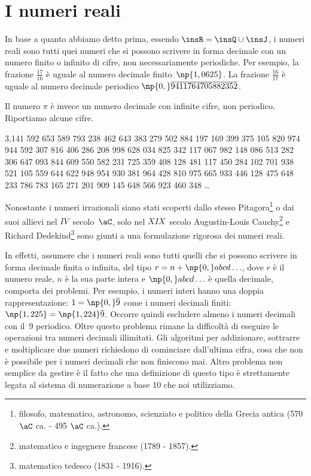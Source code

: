 \section{I numeri reali}

In base a quanto abbiamo detto prima, essendo $\insR=\insQ \cup \insJ$, i numeri reali sono tutti quei numeri che si possono scrivere in forma decimale con un numero finito o infinito di cifre, non necessariamente periodiche.
Per esempio, la frazione $\frac{17}{16}$ è uguale al numero decimale finito~$\np{1,0625}$.
La frazione $\frac{16}{17}$ è uguale al numero decimale periodico $\np{0,}\overline{9411764705882352}$.

Il numero $\pi$ è invece un numero decimale con infinite cifre, non periodico. Riportiamo alcune cifre. %

3,141 592 653 589 793 238 462 643 383 279 502 884 197 169 399 375 105 820 974 944 592 307 816 406 286
208 998 628 034 825 342 117 067 982 148 086 513 282 306 647 093 844 609 550 582 231 725 359 408 128 481 117 450 284 102
701 938 521 105 559 644 622 948 954 930 381 964 428 810 975 665 933 446 128 475 648 233 786 783 165 271 201 909 145 648
566 923 460 348 \ldots %

Nonostante i numeri irrazionali siano stati scoperti dallo stesso Pitagora\footnote{filosofo, matematico, astronomo, scienziato e politico della Grecia antica (570 $\aC$ ca. - 495 $\aC$ ca.).} o dai suoi allievi nel $IV$~secolo~$\aC$, solo nel $XIX$~secolo Augustin-Louis Cauchy\footnote{matematico e ingegnere francese (1789 - 1857).} e Richard Dedekind\footnote{matematico tedesco (1831 - 1916).} sono giunti a una formulazione rigorosa dei numeri reali.

In effetti, assumere che i numeri reali sono tutti quelli che si possono scrivere in forma decimale finita o infinita, del tipo $r=n+\np{0,}abcd\ldots$, dove $r$ è il numero reale, $n$ è la sua parte intera e $\np{0,}abcd\ldots$ è quella decimale, comporta dei problemi. Per esempio, i numeri interi hanno una doppia rappresentazione: $1=\np{0,}\overline{9}$ come i numeri decimali finiti: $\np{1,225}=\np{1,224}\overline{9}$. Occorre quindi escludere almeno i numeri decimali con il~9 periodico. Oltre questo problema rimane la difficoltà di eseguire le operazioni tra numeri decimali illimitati. Gli algoritmi per addizionare, sottrarre e moltiplicare due numeri richiedono di cominciare dall'ultima cifra, cosa che non è possibile per i numeri decimali che non finiscono mai. Altro problema non semplice da gestire è il fatto che una definizione di
questo tipo è strettamente legata al sistema di numerazione a base 10 che noi utilizziamo.

